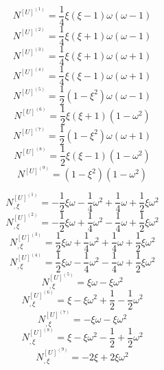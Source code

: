 \documentclass{article}
\begin{document}
\begin{equation}
N^{[U]^{(1)}} = \dfrac{1}{4}\xi(\xi-1)\omega(\omega-1) 
\end{equation}
\begin{equation}
N^{[U]^{(2)}} = \dfrac{1}{4}\xi(\xi+1)\omega(\omega-1) 
\end{equation}
\begin{equation}
N^{[U]^{(3)}} = \dfrac{1}{4}\xi(\xi+1)\omega(\omega+1) 
\end{equation}
\begin{equation}
N^{[U]^{(4)}} = \dfrac{1}{4}\xi(\xi-1)\omega(\omega+1) 
\end{equation}
\begin{equation}
N^{[U]^{(5)}} = \dfrac{1}{2}(1-\xi^2)\omega(\omega-1) 
\end{equation}
\begin{equation}
N^{[U]^{(6)}} = \dfrac{1}{2}\xi(\xi+1)(1-\omega^2) 
\end{equation}
\begin{equation}
N^{[U]^{(7)}} = \dfrac{1}{2}(1-\xi^2)\omega(\omega+1) 
\end{equation}
\begin{equation}
N^{[U]^{(8)}} = \dfrac{1}{2}\xi(\xi-1)(1-\omega^2) 
\end{equation}
\begin{equation}
N^{[U]^{(9)}} = (1-\xi^2)(1-\omega^2) 
\end{equation}

\begin{equation}
N_{,\xi}^{[U]^{(1)}} = -\dfrac{1}{2}\xi\omega-\dfrac{1}{4}\omega^2+\dfrac{1}{4}\omega+\dfrac{1}{2}\xi\omega^2 
\end{equation}
\begin{equation}
N_{,\xi}^{[U]^{(2)}} = -\dfrac{1}{2}\xi\omega+\dfrac{1}{4}\omega^2-\dfrac{1}{4}\omega+\dfrac{1}{2}\xi\omega^2 
\end{equation}
\begin{equation}
N_{,\xi}^{[U]^{(3)}} = \dfrac{1}{2}\xi\omega+\dfrac{1}{4}\omega^2+\dfrac{1}{4}\omega+\dfrac{1}{2}\xi\omega^2 
\end{equation}
\begin{equation}
N_{,\xi}^{[U]^{(4)}} = \dfrac{1}{2}\xi\omega-\dfrac{1}{4}\omega^2-\dfrac{1}{4}\omega+\dfrac{1}{2}\xi\omega^2 
\end{equation}
\begin{equation}
N_{,\xi}^{[U]^{(5)}} = \xi\omega-\xi\omega^2
\end{equation}
\begin{equation}
N_{,\xi}^{[U]^{(6)}} = \xi-\xi\omega^2+\dfrac{1}{2}-\dfrac{1}{2}\omega^2
\end{equation}
\begin{equation}
N_{,\xi}^{[U]^{(7)}} = -\xi\omega-\xi\omega^2
\end{equation}
\begin{equation}
N_{,\xi}^{[U]^{(8)}} = \xi-\xi\omega^2-\dfrac{1}{2}+\dfrac{1}{2}\omega^2
\end{equation}
\begin{equation}
N_{,\xi}^{[U]^{(9)}} = -2\xi+2\xi\omega^2
\end{equation}
\end{document}
